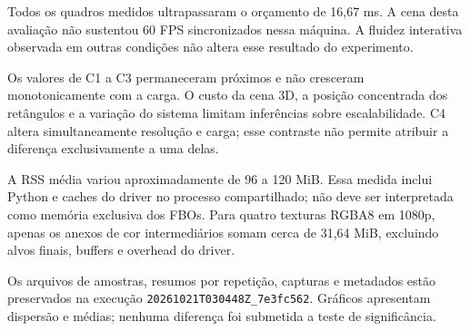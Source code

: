 Todos os quadros medidos ultrapassaram o orçamento de 16,67 ms. A cena desta avaliação não sustentou 60 FPS sincronizados nessa máquina. A fluidez interativa observada em outras condições não altera esse resultado do experimento.

Os valores de C1 a C3 permaneceram próximos e não cresceram monotonicamente com a carga. O custo da cena 3D, a posição concentrada dos retângulos e a variação do sistema limitam inferências sobre escalabilidade. C4 altera simultaneamente resolução e carga; esse contraste não permite atribuir a diferença exclusivamente a uma delas.

A RSS média variou aproximadamente de 96 a 120 MiB. Essa medida inclui Python e caches do driver no processo compartilhado; não deve ser interpretada como memória exclusiva dos FBOs. Para quatro texturas RGBA8 em 1080p, apenas os anexos de cor intermediários somam cerca de 31,64 MiB, excluindo alvos finais, buffers e overhead do driver.

Os arquivos de amostras, resumos por repetição, capturas e metadados estão preservados na execução \texttt{20261021T030448Z\_7e3fc562}. Gráficos apresentam dispersão e médias; nenhuma diferença foi submetida a teste de significância.